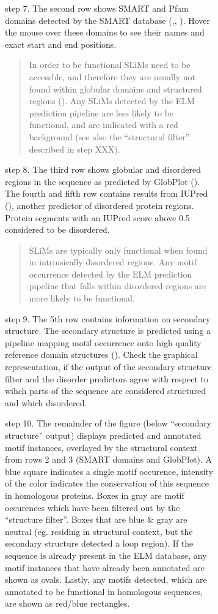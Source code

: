 {\begin{figure}[h!]
{{\begin{figure}[h!]
{{step 7. The second row shows SMART and Pfam domains detected by the
SMART database (\cite{9600884},\cite{25300481}, \cite{9600884}). Hover
the mouse over these domains to see their names and exact start and end
positions.

\begin{quote}
In order to be functional SLiMs need to be accessble, and therefore they
are usually not found within globular domains and structured regions
(\cite{21909575}). Any SLiMs detected by the ELM prediction pipeline are
less likely to be functional, and are indicated with a red background
(see also the ``structural filter'' described in step XXX).
\end{quote}

step 8. The third row shows globular and disordered regions in the
sequence as predicted by GlobPlot (\cite{12824398}). The fourth and
fifth row contains results from IUPred (\cite{15955779}), another
predictor of disordered protein regions. Protein segments with an IUPred
score above 0.5 considered to be disordered.

\begin{quote}
SLiMs are typically only functional when found in intrinsically
disordered regions. Any motif occurrence detected by the ELM prediction
pipeline that falls within disordered regions are more likely to be
functional.
\end{quote}

step 9. The 5th row contains information on secondary structure. The
secondary structure is predicted using a pipeline mapping motif
occurrence onto high quality reference domain structures
(\cite{19852836}). Check the graphical representation, if the output of
the secondary structure filter and the disorder predictors agree with
respect to wihch parts of the sequence are considered structured and
which disordered.

step 10. The remainder of the figure (below ``secondary structure''
output) displays predicted and annotated motif instances, overlayed by
the structural context from rows 2 and 3 (SMART domains and GlobPlot). A
blue square indicates a single motif occurence, intensity of the color
indicates the conservation of this sequence in homologous proteins.
Boxes in gray are motif occurences which have been filtered out by the
``structure filter''. Boxes that are blue \& gray are neutral (eg.
residing in structural context, but the secondary structure detected a
loop region). If the sequence is already present in the ELM database,
any motif instances that have already been annotated are shown as ovals.
Lastly, any motifs detected, which are annotated to be functional in
homologous sequences, are shown as red/blue rectangles.

}}
\end{figure}}}
\end{figure}}
